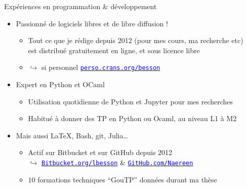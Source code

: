 \documentclass[11pt,english,ignorenonframetext,]{beamer}
\providecommand{\tightlist}{%
  \setlength{\itemsep}{0pt}\setlength{\parskip}{0pt}}
\begin{document}
\begin{frame}{Expériences en programmation \& développement}

\begin{itemize}
\item
  Passionné de logiciels libres et de libre diffusion !

  \begin{itemize}\tightlist
    \item
      Tout ce que je rédige depuis 2012 (pour mes cours, ma recherche etc)\\
      est distribué gratuitement en ligne, et sous licence libre
  \item[]
    \(\hookrightarrow\)
    si personnel
    \href{https://perso.crans.org/besson}{\textcolor{blue}{\texttt{perso.crans.org/besson}}}
  \end{itemize}

\pause
\vspace*{7pt}
\item
  \alert{Expert en Python et OCaml}

  \begin{itemize}
  \tightlist
  \item
    Utilisation quotidienne de Python et Jupyter pour mes recherches
  \item
    Habitué à donner des TP en Python ou Ocaml, au niveau L1 à M2
  \end{itemize}

\pause
\vspace*{7pt}
\item
  Mais aussi \LaTeX, Bash, git, Julia\ldots{}

  \begin{itemize}
  \tightlist
  \item
    Actif sur Bitbucket et sur GitHub depuis 2012 \\
    \(\hookrightarrow\)
    \href{https://Bitbucket.org/lbesson}{\textcolor{blue}{\texttt{Bitbucket.org/lbesson}}}
    \&
    \href{https://GitHub.com/Naereen}{\textcolor{blue}{\texttt{GitHub.com/Naereen}}}
  \item
    \(10\) formations techniques ``GouTP'' données durant ma thèse
  \end{itemize}

\end{itemize}

\end{frame}
\end{document}
